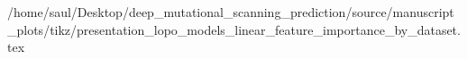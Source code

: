 /home/saul/Desktop/deep_mutational_scanning_prediction/source/manuscript_plots/tikz/presentation_lopo_models_linear_feature_importance_by_dataset.tex